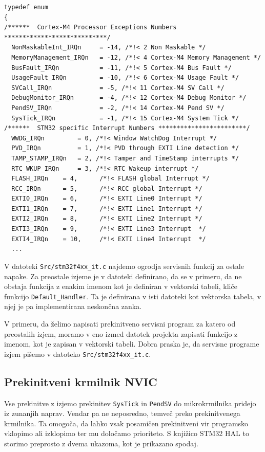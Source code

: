 \documentclass[12pt,letterpaper]{article}
\begin{document}
\begin{center}
\begin{lstlisting}[style=CStyle]
typedef enum
{
/******  Cortex-M4 Processor Exceptions Numbers ****************************/
  NonMaskableInt_IRQn     = -14, /*!< 2 Non Maskable */
  MemoryManagement_IRQn   = -12, /*!< 4 Cortex-M4 Memory Management */
  BusFault_IRQn           = -11, /*!< 5 Cortex-M4 Bus Fault */
  UsageFault_IRQn         = -10, /*!< 6 Cortex-M4 Usage Fault */
  SVCall_IRQn             = -5, /*!< 11 Cortex-M4 SV Call */
  DebugMonitor_IRQn       = -4, /*!< 12 Cortex-M4 Debug Monitor */
  PendSV_IRQn             = -2, /*!< 14 Cortex-M4 Pend SV */
  SysTick_IRQn            = -1, /*!< 15 Cortex-M4 System Tick */
/******  STM32 specific Interrupt Numbers ************************/
  WWDG_IRQn         = 0, /*!< Window WatchDog Interrupt */
  PVD_IRQn          = 1, /*!< PVD through EXTI Line detection */
  TAMP_STAMP_IRQn   = 2, /*!< Tamper and TimeStamp interrupts */
  RTC_WKUP_IRQn     = 3, /*!< RTC Wakeup interrupt */
  FLASH_IRQn    = 4,      /*!< FLASH global Interrupt */
  RCC_IRQn      = 5,      /*!< RCC global Interrupt */
  EXTI0_IRQn    = 6,      /*!< EXTI Line0 Interrupt */
  EXTI1_IRQn    = 7,      /*!< EXTI Line1 Interrupt */
  EXTI2_IRQn    = 8,      /*!< EXTI Line2 Interrupt */
  EXTI3_IRQn    = 9,      /*!< EXTI Line3 Interrupt  */
  EXTI4_IRQn    = 10,     /*!< EXTI Line4 Interrupt  */
  ...
\end{lstlisting}
\end{center}

V datoteki \texttt{Src/stm32f4xx\_it.c} najdemo ogrodja servisnih funkcij za ostale napake. Za preostale izjeme je v datoteki definirano, da se v primeru, da ne obstaja funkcija z enakim imenom kot je definiran v vektorski tabeli, kliče funkcijo \texttt{Default\_Handler}. Ta je definirana v isti datoteki kot vektorska tabela, v njej je pa implementirana neskončna zanka.

V primeru, da želimo napisati prekinitveno servisni program za katero od preostalih izjem, moramo v eno izmed datotek projekta zapisati funkcijo z imenom, kot je zapisan v vektorski tabeli. Dobra praska je, da servisne programe izjem pišemo v datoteko \texttt{Src/stm32f4xx\_it.c}.

\subsection*{Prekinitveni krmilnik NVIC}

Vse prekinitve z izjemo prekinitev \texttt{SysTick} in \texttt{PendSV} do mikrokrmilnika pridejo iz zunanjih naprav. Vendar pa ne neposredno, temveč preko prekinitvenega krmilnika. Ta omogoča, da lahko vsak posamičen prekinitveni vir programsko vklopimo ali izklopimo ter mu določamo prioriteto. S knjižico STM32 HAL to storimo preprosto z dvema ukazoma, kot je prikazano spodaj.
\end{document}
